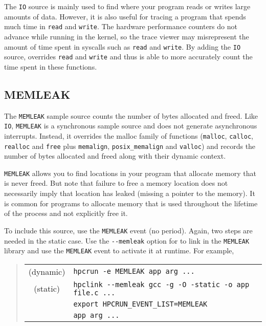 The \verb|IO| source is mainly used to find where your program reads or
writes large amounts of data.  However, it is also useful for tracing
a program that spends much time in \verb|read| and \verb|write|.  The
hardware performance counters do not advance while running in
the kernel, so the trace viewer may misrepresent the amount of time
spent in syscalls such as \verb|read| and \verb|write|.  By adding the
\verb|IO| source, \hpcrun{} overrides \verb|read| and \verb|write| and
thus is able to more accurately count the time spent in these
functions.

\subsection{MEMLEAK}

The \verb|MEMLEAK| sample source counts the number of bytes allocated
and freed.  Like \verb|IO|, \verb|MEMLEAK| is a synchronous sample
source and does not generate asynchronous interrupts.  Instead, it
overrides the malloc family of functions (\verb|malloc|, \verb|calloc|,
\verb|realloc| and \verb|free| plus \verb|memalign|, \verb|posix_memalign|
and \verb|valloc|) and records the number of bytes
allocated and freed along with their dynamic context.

\verb|MEMLEAK| allows you to find locations in your program that
allocate memory that is never freed.  But note that failure to free a
memory location does not necessarily imply that location has leaked
(missing a pointer to the memory).  It is common for programs to
allocate memory that is used throughout the lifetime of the process
and not explicitly free it.

To include this source, use the \verb|MEMLEAK| event (no period).
Again, two steps are needed in the static case.  Use the \verb|--memleak|
option for \hpclink{} to link in the \verb|MEMLEAK| library
and use the \verb|MEMLEAK| event to activate it at runtime.  For
example,

\begin{quote}
\begin{tabular}{@{}cl}
(dynamic) & \verb|hpcrun -e MEMLEAK app arg ...| \\
(static)  & \verb|hpclink --memleak gcc -g -O -static -o app file.c ...| \\
& \verb|export HPCRUN_EVENT_LIST=MEMLEAK| \\
& \verb|app arg ...|
\end{tabular}
\end{quote}

